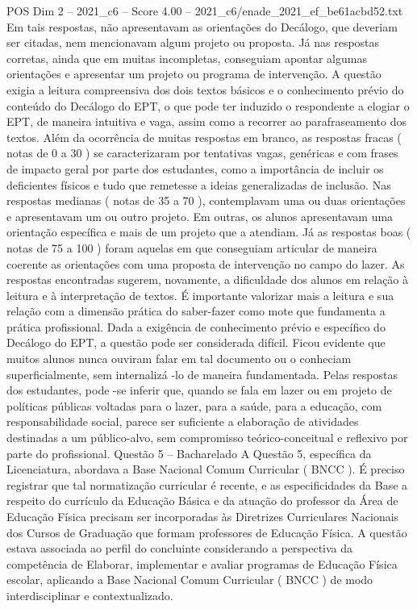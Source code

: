 \begin{textsample}{POS Dim 2 – 2021\_c6 – Score 4.00 – 2021\_c6/enade\_2021\_ef\_be61acbd52.txt}
Em tais respostas, não apresentavam as orientações do Decálogo, que deveriam ser citadas, nem mencionavam algum projeto ou proposta.
Já nas respostas corretas, ainda que em muitas incompletas, conseguiam apontar algumas orientações e apresentar um projeto ou programa de intervenção.
A questão exigia a leitura compreensiva dos dois textos básicos e o conhecimento prévio do conteúdo do Decálogo do EPT, o que pode ter induzido o respondente a elogiar o EPT, de maneira intuitiva e vaga, assim como a recorrer ao parafraseamento dos textos.
Além da ocorrência de muitas respostas em branco, as respostas fracas ( notas de 0 a 30 ) se caracterizaram por tentativas vagas, genéricas e com frases de impacto geral por parte dos estudantes, como a importância de incluir os deficientes físicos e tudo que remetesse a ideias generalizadas de inclusão.
Nas respostas medianas ( notas de 35 a 70 ), contemplavam uma ou duas orientações e apresentavam um ou outro projeto.
Em outras, os alunos apresentavam uma orientação específica e mais de um projeto que a atendiam.
Já as respostas boas ( notas de 75 a 100 ) foram aquelas em que conseguiam articular de maneira coerente as orientações com uma proposta de intervenção no campo do lazer.
As respostas encontradas sugerem, novamente, a dificuldade dos alunos em relação à leitura e à interpretação de textos.
É importante valorizar mais a leitura e sua relação com a dimensão prática do saber-fazer como mote que fundamenta a prática profissional.
Dada a exigência de conhecimento prévio e específico do Decálogo do EPT, a questão pode ser considerada difícil.
Ficou evidente que muitos alunos nunca ouviram falar em tal documento ou o conheciam superficialmente, sem internalizá -lo de maneira fundamentada.
Pelas respostas dos estudantes, pode -se inferir que, quando se fala em lazer ou em projeto de políticas públicas voltadas para o lazer, para a saúde, para a educação, com responsabilidade social, parece ser suficiente a elaboração de atividades destinadas a um público-alvo, sem compromisso teórico-conceitual e reflexivo por parte do profissional.
Questão 5 – Bacharelado A Questão 5, específica da Licenciatura, abordava a Base Nacional Comum Curricular ( BNCC ).
É preciso registrar que tal normatização curricular é recente, e as especificidades da Base a respeito do currículo da Educação Básica e da atuação do professor da Área de Educação Física precisam ser incorporadas às Diretrizes Curriculares Nacionais dos Cursos de Graduação que formam professores de Educação Física.
A questão estava associada ao perfil do concluinte considerando a perspectiva da competência de Elaborar, implementar e avaliar programas de Educação Física escolar, aplicando a Base Nacional Comum Curricular ( BNCC ) de modo interdisciplinar e contextualizado.

\end{textsample}

